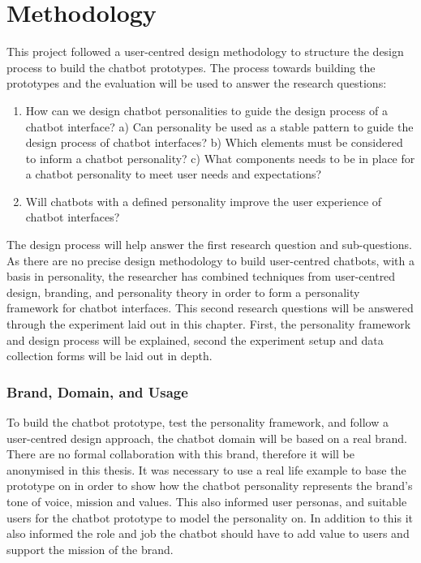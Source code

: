 \chapter{Methodology}
\label{chap:methodology}

This project followed a user-centred design methodology to structure the design process to build the chatbot prototypes. The process towards building the prototypes and the evaluation will be used to answer the research questions:

\begin{enumerate}
    \item How can we design chatbot personalities to guide the design process of a chatbot interface? 
        \subitem a) Can personality be used as a stable pattern to guide the design \subitem    process of chatbot interfaces?
        \subitem b) Which elements must be considered to inform a chatbot personality?
        \subitem c) What components needs to be in place for a chatbot personality to \subitem  meet user needs and expectations?
    \item Will chatbots with a defined personality improve the user experience of chatbot interfaces?
\end{enumerate}

The design process will help answer the first research question and sub-questions. As there are no precise design methodology to build user-centred chatbots, with a basis in personality, the researcher has combined techniques from user-centred design, branding, and personality theory in order to form a personality framework for chatbot interfaces. This second research questions will be answered through the experiment laid out in this chapter. First, the personality framework and design process will be explained, second the experiment setup and data collection forms will be laid out in depth.

\vspace{5mm} %

\subsection{Brand, Domain, and Usage}

To build the chatbot prototype, test the personality framework, and follow a user-centred design approach, the chatbot domain will be based on a real brand. There are no formal collaboration with this brand, therefore it will be anonymised in this thesis. It was necessary to use a real life example to base the prototype on in order to show how the chatbot personality represents the brand's tone of voice, mission and values. This also informed user personas, and suitable users for the chatbot prototype to model the personality on. In addition to this it also informed the role and job the chatbot should have to add value to users and support the mission of the brand.

